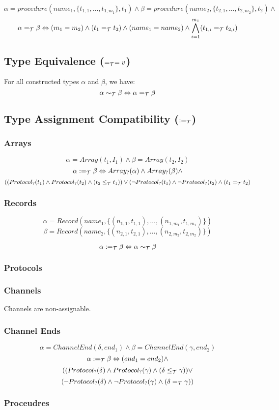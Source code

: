 \documentclass[]{article}
\begin{document}
\[
\alpha = procedure(name_1, \{t_{1,1},\ldots,t_{1,m_1}\}, t_1) \wedge
\beta = procedure(name_2, \{t_{2,1},\ldots,t_{2,m_2}\}, t_2) \wedge
\]
\[
\alpha =_{\cal T} \beta \Leftrightarrow (m_1 = m_2) \wedge (t_1 =_{\cal T} t_2) \wedge (name_1 = name_2) \wedge \bigwedge^{m_1}_{i=1}(t_{1,i} =_{\cal T} t_{2,i})
\]
\subsection{Type Equivalence ($=_{\cal T}=v$)}

For all constructed types $\alpha$ and $\beta$, we have:
\[
\alpha \sim_{\cal T} \beta \Leftrightarrow \alpha =_{\cal T} \beta
\]

\subsection{Type Assignment Compatibility ($:=_{\cal T}$)}

\subsubsection{Arrays}

\[
\alpha = Array(t_1, I_1) \wedge \beta =  Array(t_2, I_2)
\]
\[
\alpha :=_{\cal T} \beta \Leftrightarrow Array_?(\alpha) \wedge Array_?(\beta) \wedge
\]
\[
((Protocol_?(t_1) \wedge Protocol_?(t_2) \wedge (t_2 \leq_{\cal T} t_1)) \vee
(\neg{}Protocol_?(t_1) \wedge \neg{}Protocol_?(t_2) \wedge (t_1 =_{\cal T} t_2)
\]
\subsubsection{Records}

\[
\alpha = Record(name_1, \{(n_{1,1},t_{1,1}),\ldots,(n_{1,m_1}, t_{1,m_1})\})
\]
\[
\beta = Record(name_2, \{(n_{2,1},t_{2,1}),\ldots,(n_{2,m_2}, t_{2,m_2})\})
\]

\[
\alpha :=_{\cal T} \beta \Leftrightarrow \alpha \sim_{\cal T} \beta
\]
\subsubsection{Protocols}



\subsubsection{Channels}

Channels are non-assignable.

\subsubsection{Channel Ends}

\[
\alpha = ChannelEnd(\delta, end_1) \wedge \beta = ChannelEnd(\gamma, end_2)
\]
\[
\alpha :=_{\cal T} \beta \Leftrightarrow (end_1 = end_2) \wedge
\]
\[
 ((Protocol_?(\delta) \wedge Protocol_?(\gamma) \wedge (\delta \leq_{\cal T} \gamma)) \vee
\]
\[
(\neg{}Protocol_?(\delta) \wedge \neg{}Protocol_?(\gamma) \wedge (\delta =_{\cal T} \gamma))
\]


\subsubsection{Proceudres}
\end{document}
